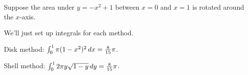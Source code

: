 
\begin{example} Suppose the area under $y=-x^2+1$ between $x=0$ and $x=1$ is
rotated around the $x$-axis. 
\end{example}

\begin{solution}
We'll just set up integrals for each method.

Disk method: $\int_0^1 \pi(1-x^2)^2\, d x={8\over15}\pi$.


Shell method: $\int_0^1 2\pi y \sqrt{1-y}\, d y={8\over15}\pi$.
\end{solution}

